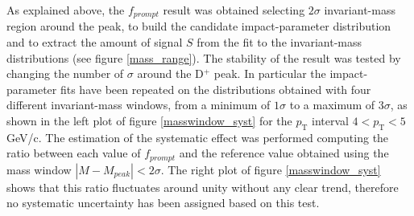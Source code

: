 \documentclass[b5paper,10pt,twoside,oldstyle,classica]{toptesi}
\newcommand{\pt}{p_\text{T}}
\begin{document}
As explained above, the $f_{prompt}$ result was obtained selecting $2\sigma$ invariant-mass region around the peak, to build the candidate impact-parameter distribution and to extract the amount of signal $S$ from the fit to the invariant-mass distributions (see figure \ref{mass_range}). The stability of the result was tested by changing the number of $\sigma$ around the D$^+$ peak. In particular the impact-parameter fits have been repeated on the distributions obtained with four different invariant-mass windows, from a minimum of $1\sigma$ to a maximum of $3\sigma$, as shown in the left plot of figure \ref{masswindow_syst} for the $\pt$ interval $4<\pt<5$ GeV/c. The estimation of the systematic effect was performed computing the ratio between each value of $f_{prompt}$ and the reference value obtained using the mass window $|M-M_{peak}|<2\sigma$. The right plot of figure \ref{masswindow_syst} shows that this ratio fluctuates around unity without any clear trend, therefore no systematic uncertainty has been assigned based on this test.
\end{document}
